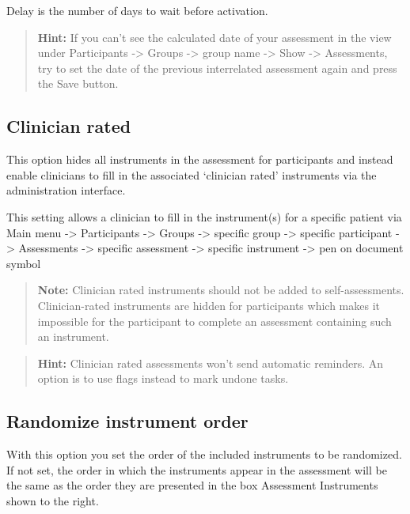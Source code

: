 \documentclass[]{book}
\begin{document}
Delay is the number of days to wait before activation.

\begin{quote}
\textbf{Hint:} If you can't see the calculated date of your assessment in the view under Participants -\textgreater{} Groups -\textgreater{} group name -\textgreater{} Show -\textgreater{} Assessments, try to set the date of the previous interrelated assessment again and press the Save button.
\end{quote}

\hypertarget{clinician-rated}{%
\subsection{Clinician rated}\label{clinician-rated}}

This option hides all instruments in the assessment for participants and instead enable clinicians to fill in the associated `clinician rated' instruments via the administration interface.

This setting allows a clinician to fill in the instrument(s) for a specific patient via Main menu -\textgreater{} Participants -\textgreater{} Groups -\textgreater{} specific group -\textgreater{} specific participant -\textgreater{} Assessments -\textgreater{} specific assessment -\textgreater{} specific instrument -\textgreater{} pen on document symbol

\begin{quote}
\textbf{Note:} Clinician rated instruments should not be added to self-assessments. Clinician-rated instruments are hidden for participants which makes it impossible for the participant to complete an assessment containing such an instrument.
\end{quote}

\begin{quote}
\textbf{Hint:} Clinician rated assessments won't send automatic reminders. An option is to use flags instead to mark undone tasks.
\end{quote}

\hypertarget{randomize-instrument-order}{%
\subsection{Randomize instrument order}\label{randomize-instrument-order}}

With this option you set the order of the included instruments to be randomized. If not set, the order in which the instruments appear in the assessment will be the same as the order they are presented in the box Assessment Instruments shown to the right.
\end{document}
